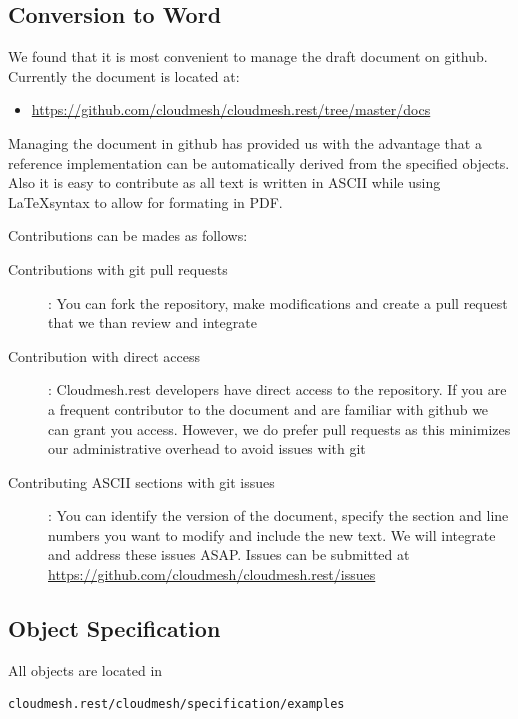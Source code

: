 \documentclass[10pt]{article}
\begin{document}
\subsection{Conversion to Word}

We found that it is most convenient to manage the draft document on
github. Currently the document is located at:

\begin{itemize}
\item \url{https://github.com/cloudmesh/cloudmesh.rest/tree/master/docs}
\end{itemize}

Managing the document in github has provided us with the advantage that a
reference implementation can be automatically derived from the
specified objects. Also it is easy to contribute as all text is
written in ASCII while using \LaTeX syntax to allow for formating in
PDF. 

Contributions can be mades as follows:

\begin{description}
\item[Contributions with git pull requests]: You can fork the
  repository, make modifications and create a pull request that we
  than review and integrate
\item[Contribution with direct access]: Cloudmesh.rest developers have
  direct access to the repository. If you are a frequent contributor
  to the document and are familiar with github we can grant you
  access. However, we do prefer pull requests as this minimizes our
  administrative overhead to avoid issues with git
\item[Contributing ASCII sections with git issues]: You can identify
  the version of the document, specify the section and line numbers
  you want to modify and include the new text. We will integrate and
  address these issues ASAP. Issues can be submitted at 
  \url{https://github.com/cloudmesh/cloudmesh.rest/issues}
\end{description}


\subsection{Object Specification}

All objects are located in 

\begin{verbatim}
cloudmesh.rest/cloudmesh/specification/examples
\end{verbatim}
\end{document}
